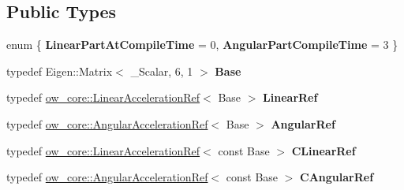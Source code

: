 \subsection*{Public Types}
\begin{DoxyCompactItemize}
\item 
enum \{ {\bfseries Linear\+Part\+At\+Compile\+Time} = 0, 
{\bfseries Angular\+Part\+Compile\+Time} = 3
 \}\hypertarget{structow_1_1traits_3_01ow__core_1_1CartesianAcceleration_3_01__Scalar_01_4_01_4_a406bb6249dbc146f7bba64d58c22c4b4}{}\label{structow_1_1traits_3_01ow__core_1_1CartesianAcceleration_3_01__Scalar_01_4_01_4_a406bb6249dbc146f7bba64d58c22c4b4}

\item 
typedef Eigen\+::\+Matrix$<$ \+\_\+\+Scalar, 6, 1 $>$ {\bfseries Base}\hypertarget{structow_1_1traits_3_01ow__core_1_1CartesianAcceleration_3_01__Scalar_01_4_01_4_aaee00a88e43aa0221b85b23303f27d84}{}\label{structow_1_1traits_3_01ow__core_1_1CartesianAcceleration_3_01__Scalar_01_4_01_4_aaee00a88e43aa0221b85b23303f27d84}

\item 
typedef \hyperlink{classow__core_1_1LinearAccelerationRef}{ow\+\_\+core\+::\+Linear\+Acceleration\+Ref}$<$ Base $>$ {\bfseries Linear\+Ref}\hypertarget{structow_1_1traits_3_01ow__core_1_1CartesianAcceleration_3_01__Scalar_01_4_01_4_a0ffdf99ef3619da527f626e58e98335f}{}\label{structow_1_1traits_3_01ow__core_1_1CartesianAcceleration_3_01__Scalar_01_4_01_4_a0ffdf99ef3619da527f626e58e98335f}

\item 
typedef \hyperlink{classow__core_1_1AngularAccelerationRef}{ow\+\_\+core\+::\+Angular\+Acceleration\+Ref}$<$ Base $>$ {\bfseries Angular\+Ref}\hypertarget{structow_1_1traits_3_01ow__core_1_1CartesianAcceleration_3_01__Scalar_01_4_01_4_af2288441d646b63444d42b2e6c43ed30}{}\label{structow_1_1traits_3_01ow__core_1_1CartesianAcceleration_3_01__Scalar_01_4_01_4_af2288441d646b63444d42b2e6c43ed30}

\item 
typedef \hyperlink{classow__core_1_1LinearAccelerationRef}{ow\+\_\+core\+::\+Linear\+Acceleration\+Ref}$<$ const Base $>$ {\bfseries C\+Linear\+Ref}\hypertarget{structow_1_1traits_3_01ow__core_1_1CartesianAcceleration_3_01__Scalar_01_4_01_4_a9e467afcf9a08d421d1855fe1ad86761}{}\label{structow_1_1traits_3_01ow__core_1_1CartesianAcceleration_3_01__Scalar_01_4_01_4_a9e467afcf9a08d421d1855fe1ad86761}

\item 
typedef \hyperlink{classow__core_1_1AngularAccelerationRef}{ow\+\_\+core\+::\+Angular\+Acceleration\+Ref}$<$ const Base $>$ {\bfseries C\+Angular\+Ref}\hypertarget{structow_1_1traits_3_01ow__core_1_1CartesianAcceleration_3_01__Scalar_01_4_01_4_a864ceea98ecb4a28aebb3aa4d6519440}{}\label{structow_1_1traits_3_01ow__core_1_1CartesianAcceleration_3_01__Scalar_01_4_01_4_a864ceea98ecb4a28aebb3aa4d6519440}

\end{DoxyCompactItemize}


